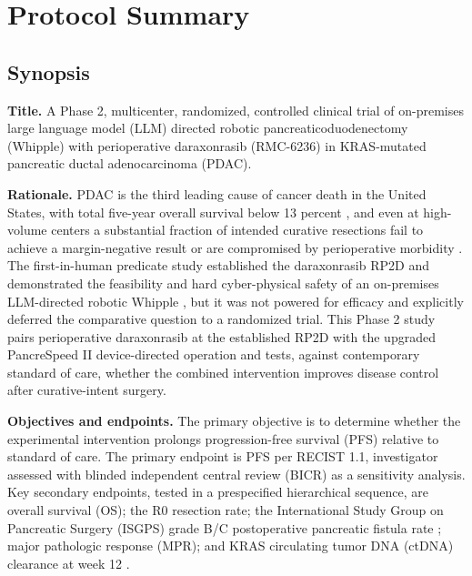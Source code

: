 \section{Protocol Summary}

\subsection{Synopsis}

\textbf{Title.} A Phase 2, multicenter, randomized, controlled clinical trial of
on-premises large language model (LLM) directed robotic pancreaticoduodenectomy
(Whipple) with perioperative daraxonrasib (RMC-6236) in KRAS-mutated pancreatic
ductal adenocarcinoma (PDAC).

\textbf{Rationale.} PDAC is the third leading cause of cancer death in the United
States, with total five-year overall survival below 13 percent
\cite{Siegel2025}, and even at high-volume centers a substantial fraction of
intended curative resections fail to achieve a margin-negative result or are
compromised by perioperative morbidity \cite{DutchCohort2025}. The first-in-human
predicate study established the daraxonrasib RP2D and demonstrated the
feasibility and hard cyber-physical safety of an on-premises LLM-directed robotic
Whipple \cite{kawchak2026phase1}, but it was not powered for efficacy and
explicitly deferred the comparative question to a randomized trial. This Phase 2
study pairs perioperative daraxonrasib at the established RP2D with the upgraded
PancreSpeed II device-directed operation and tests, against contemporary standard
of care, whether the combined intervention improves disease control after
curative-intent surgery.

\textbf{Objectives and endpoints.} The primary objective is to determine whether
the experimental intervention prolongs progression-free survival (PFS) relative to
standard of care. The primary endpoint is PFS per RECIST 1.1, investigator
assessed with blinded independent central review (BICR) as a sensitivity analysis.
Key secondary endpoints, tested in a prespecified hierarchical sequence, are
overall survival (OS); the R0 resection rate; the International Study Group on
Pancreatic Surgery (ISGPS) grade B/C postoperative pancreatic fistula rate
\cite{Bassi2017}; major pathologic response (MPR); and KRAS circulating tumor DNA
(ctDNA) clearance at week 12 \cite{Tie2019ctdna}.

